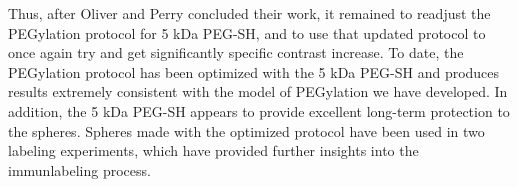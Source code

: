 Thus, after Oliver and Perry concluded their work, it remained to readjust the PEGylation protocol for 5 kDa PEG-SH, and to use that updated protocol to once again try and get significantly specific contrast increase. To date, the PEGylation protocol has been optimized with the 5 kDa PEG-SH and produces results extremely consistent with the model of PEGylation we have developed. In addition, the 5 kDa PEG-SH appears to provide excellent long-term protection to the spheres. Spheres made with the optimized protocol have been used in two labeling experiments, which have provided further insights into the immunlabeling process.
